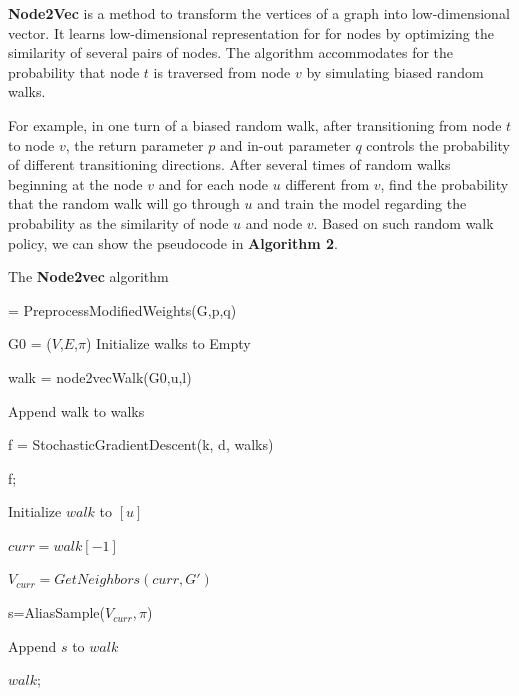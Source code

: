 \documentclass[sigconf, nonacm]{acmart}
\begin{document}
\textbf{Node2Vec} is a method to transform the vertices of a graph into low-dimensional vector. It learns low-dimensional representation for for nodes by optimizing the similarity of several pairs of nodes. The algorithm accommodates for the probability that node $t$ is traversed from node $v$ by simulating biased random walks.

For example, in one turn of a biased random walk, after transitioning from node $t$ to node $v$, the return parameter $p$ and in-out parameter $q$ controls the probability of different transitioning directions. After several times of random walks beginning at the node $v$ and for each node $u$ different from $v$, find the probability that the random walk will go through $u$ and train the model regarding the probability as the similarity of node $u$ and node $v$. Based on such random walk policy, we can show the pseudocode in \textbf{Algorithm 2}. 

\begin{algorithm}[htbp]  
	\caption{The \textbf{Node2vec} algorithm\cite{grover2016node2vec}}  
	\label{node2vecalgo}  
	\begin{algorithmic}[1]  
		= PreprocessModifiedWeights(G,p,q) 
		
		G0 = ($V$,$E$,$\pi$) Initialize walks to Empty
		
		
		\qquad walk = node2vecWalk(G0,u,l) 
		
		\qquad Append walk to walks 
		\EndFor
		\EndFor
		
		f = StochasticGradientDescent(k, d, walks)
		
		\Return f;  
		\EndFunction
		
		
		Initialize $walk$ to $[u]$
		
		\qquad $curr=walk[-1]$
		
		\qquad $V_{curr}=GetNeighbors(curr,G')$\;
		
		\qquad s=AliasSample($V_{curr},\pi$)
		
		\qquad Append $s$ to $walk$
		
		\EndFor
	
		\Return $walk$;
		\EndFunction
	\end{algorithmic}
\end{algorithm}  
\end{document}
